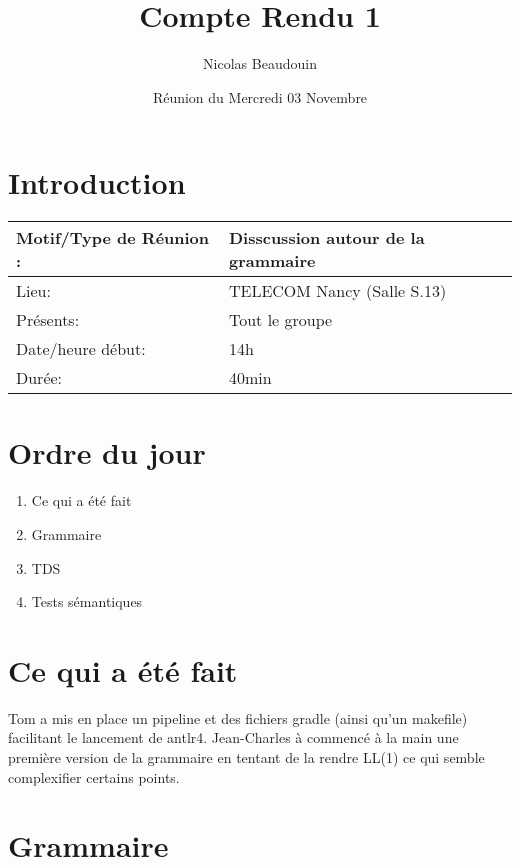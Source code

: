 \documentclass[french]{article}
\title{Compte Rendu 1}
\author{Nicolas Beaudouin}
\date{Réunion du Mercredi 03 Novembre}
\begin{document}
\maketitle

\section*{Introduction}
\begin{flushleft}
 \begin{tabular}{|m{4cm}|m{8cm}|}
    \hline
    Motif/Type de Réunion :  & Disscussion autour de la grammaire  \\
    \hline
    Lieu:  & TELECOM Nancy (Salle S.13) \\
    \hline
    Présents:  & Tout le groupe \\
    \hline \hline
    Date/heure début:  & 14h \\
    \hline
    Durée: & 40min \\
    \hline
 \end{tabular}
\end{flushleft}

\section*{Ordre du jour}

\begin{enumerate}
    \item Ce qui a été fait\\
    \item Grammaire \\
    \item TDS \\
    \item Tests sémantiques \\
\end{enumerate}

\section*{Ce qui a été fait}

Tom a mis en place un pipeline et des fichiers gradle (ainsi qu'un makefile) facilitant le lancement de antlr4.
Jean-Charles à commencé à la main une première version de la grammaire en tentant de la rendre LL(1) ce qui semble complexifier certains points.

\section*{Grammaire}
\end{document}
